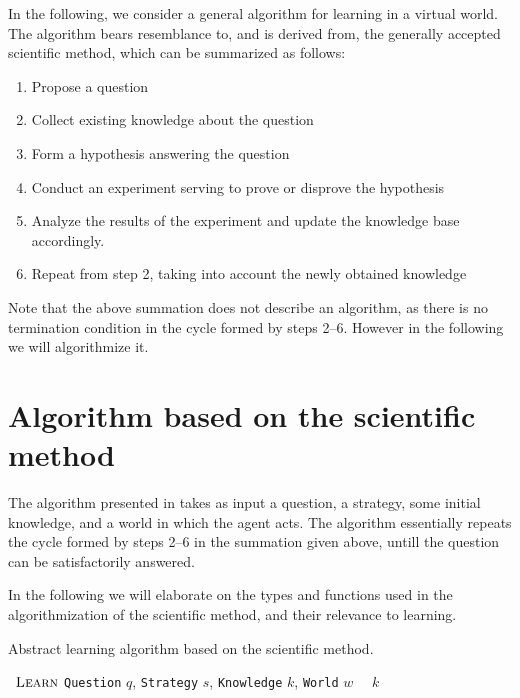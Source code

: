 \documentclass[\master/Master.tex]{subfiles}
\begin{document}
In the following, we consider a general algorithm for learning in a virtual world. The algorithm bears resemblance to, and is derived from, the generally accepted scientific method, which can be summarized as follows:

\begin{enumerate}
    \item Propose a question
    \item Collect existing knowledge about the question
    \item Form a hypothesis answering the question
    \item Conduct an experiment serving to prove or disprove the hypothesis
    \item Analyze the results of the experiment and update the knowledge base accordingly.
    \item Repeat from step 2, taking into account the newly obtained knowledge
\end{enumerate}

Note that the above summation does not describe an algorithm, as there is no termination condition in the cycle formed by steps 2--6. However in the following we will algorithmize it.

\section{Algorithm based on the scientific method}

The algorithm presented in  takes as input a question, a strategy, some initial knowledge, and a world in which the agent acts. The algorithm essentially repeats the cycle formed by steps 2--6 in the summation given above, untill the question can be satisfactorily answered.

In the following we will elaborate on the types and functions used in the algorithmization of the scientific method, and their relevance to learning.

\begin{algorithm}
    \caption{Abstract learning algorithm based on the scientific method.}\label{algo:science}

    \begin{algorithmic}
        \Function~{$\textsc{Learn}$} {\texttt{Question} $q$, \texttt{Strategy} $s$, \texttt{Knowledge} $k$, \texttt{World} $w$}
                \Else%
                \EndIf%
            \EndWhile%
            \State~\Return~$k$
        \EndFunction%
    \end{algorithmic}
\end{algorithm}
\end{document}
